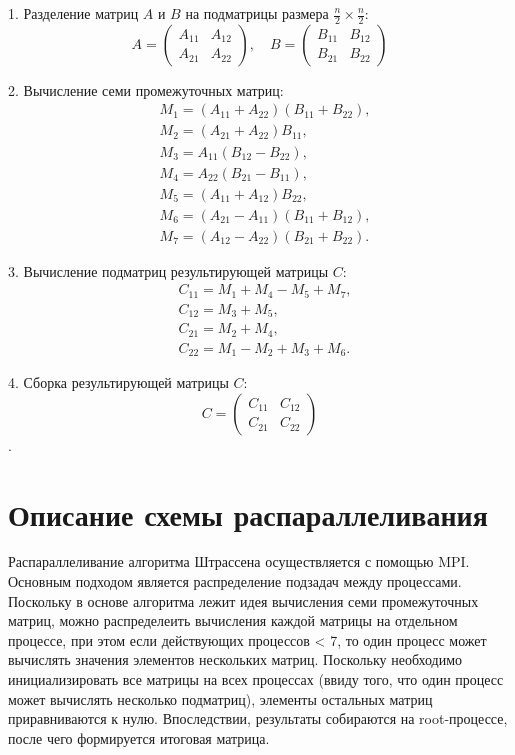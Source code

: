 \documentclass[a4paper,12pt]{article}
\begin{document}
1. Разделение матриц $A$ и $B$ на подматрицы размера $\frac{n}{2} \times \frac{n}{2}$:
$$
A = \begin{pmatrix} A_{11} & A_{12} \\ A_{21} & A_{22} \end{pmatrix}, \quad B = \begin{pmatrix} B_{11} & B_{12} \\ B_{21} & B_{22} \end{pmatrix}
$$

2. Вычисление семи промежуточных матриц:
$$
\begin{aligned}
    &M_1 = (A_{11} + A_{22})(B_{11} + B_{22}), \\
    &M_2 = (A_{21} + A_{22}) B_{11}, \\
    &M_3 = A_{11} (B_{12} - B_{22}), \\
    &M_4 = A_{22} (B_{21} - B_{11}), \\
    &M_5 = (A_{11} + A_{12}) B_{22}, \\
    &M_6 = (A_{21} - A_{11}) (B_{11} + B_{12}), \\
    &M_7 = (A_{12} - A_{22}) (B_{21} + B_{22}).
\end{aligned}
$$

3. Вычисление подматриц результирующей матрицы $C$:
$$
\begin{aligned}
    &C_{11} = M_1 + M_4 - M_5 + M_7, \\
    &C_{12} = M_3 + M_5, \\
    &C_{21} = M_2 + M_4, \\
    &C_{22} = M_1 - M_2 + M_3 + M_6.
\end{aligned}
$$

4. Сборка результирующей матрицы $C$:
$$
C = \begin{pmatrix} C_{11} & C_{12} \\ C_{21} & C_{22} \end{pmatrix}
$$.


\section{Описание схемы распараллеливания}
Распараллеливание алгоритма Штрассена осуществляется с помощью MPI. Основным подходом является распределение подзадач между процессами. Поскольку в основе алгоритма лежит идея вычисления семи промежуточных матриц, можно распределеить вычисления каждой матрицы на отдельном процессе, при этом если действующих процессов < 7, то один процесс может вычислять значения элементов нескольких матриц. Поскольку необходимо инициализировать все матрицы на всех процессах (ввиду того, что один процесс может вычислять несколько подматриц), элементы остальных матриц приравниваются к нулю. Впоследствии, результаты собираются на root-процессе, после чего формируется итоговая матрица.
\end{document}
